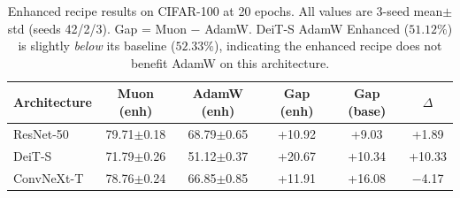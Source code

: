 \begin{table}[h]
\centering
\caption{Enhanced recipe results on CIFAR-100 at 20 epochs. All values are 3-seed mean$\pm$std (seeds 42/2/3). Gap = Muon $-$ AdamW. DeiT-S AdamW Enhanced ($51.12\%$) is slightly \emph{below} its baseline ($52.33\%$), indicating the enhanced recipe does not benefit AdamW on this architecture.}
\label{tab:enhanced_recipe}
\vspace{-0.5em}
\small
\begin{tabular}{@{}lccccc@{}}
\toprule
Architecture & Muon (enh) & AdamW (enh) & Gap (enh) & Gap (base) & $\Delta$ \\
\midrule
ResNet-50 & 79.71{\scriptsize$\pm$0.18} & 68.79{\scriptsize$\pm$0.65} & +10.92 & +9.03 & +1.89 \\
DeiT-S & 71.79{\scriptsize$\pm$0.26} & 51.12{\scriptsize$\pm$0.37} & +20.67 & +10.34 & +10.33 \\
ConvNeXt-T & 78.76{\scriptsize$\pm$0.24} & 66.85{\scriptsize$\pm$0.85} & +11.91 & +16.08 & $-$4.17 \\
\bottomrule
\end{tabular}
\vspace{-0.5em}
\end{table}
